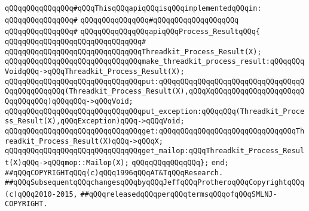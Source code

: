 \verb|qQQqqQQqqQQqqQQq#qQQqThisqQQqapiqQQqisqQQqimplementedqQQqin:|\newline
\verb|qQQqqQQqqQQqqQQq#|\newline
\verb|qQQqqQQqqQQqqQQq#qQQqqQQqqQQqqQQqqQQq|\newline
\verb|qQQqqQQqqQQqqQQq#|\newline
\verb|qQQqqQQqqQQqqQQqapiqQQqProcess_ResultqQQq{|\newline
\verb|qQQqqQQqqQQqqQQqqQQqqQQqqQQqqQQq#|\newline
\verb|qQQqqQQqqQQqqQQqqQQqqQQqqQQqqQQqThreadkit_Process_Result(X);|\newline
\newline
\verb|qQQqqQQqqQQqqQQqqQQqqQQqqQQqqQQqmake_threadkit_process_result:qQQqqQQqVoidqQQq->qQQqThreadkit_Process_Result(X);|\newline
\newline
\verb|qQQqqQQqqQQqqQQqqQQqqQQqqQQqqQQqput:qQQqqQQqqQQqqQQqqQQqqQQqqQQqqQQqqQQqqQQqqQQqqQQq(Threadkit_Process_Result(X),qQQqXqQQqqQQqqQQqqQQqqQQqqQQqqQQqqQQq)qQQqqQQq->qQQqVoid;|\newline
\verb|qQQqqQQqqQQqqQQqqQQqqQQqqQQqqQQqput_exception:qQQqqQQq(Threadkit_Process_Result(X),qQQqException)qQQq->qQQqVoid;|\newline
\newline
\verb|qQQqqQQqqQQqqQQqqQQqqQQqqQQqqQQqget:qQQqqQQqqQQqqQQqqQQqqQQqqQQqqQQqThreadkit_Process_Result(X)qQQq->qQQqX;|\newline
\verb|qQQqqQQqqQQqqQQqqQQqqQQqqQQqqQQqget_mailop:qQQqThreadkit_Process_Result(X)qQQq->qQQqmop::Mailop(X);|\newline
\verb|qQQqqQQqqQQqqQQq};|\newline
\verb|end;|\newline
\newline
\newline
\verb|##qQQqCOPYRIGHTqQQq(c)qQQq1996qQQqAT&TqQQqResearch.|\newline
\verb|##qQQqSubsequentqQQqchangesqQQqbyqQQqJeffqQQqProtheroqQQqCopyrightqQQq(c)qQQq2010-2015,|\newline
\verb|##qQQqreleasedqQQqperqQQqtermsqQQqofqQQqSMLNJ-COPYRIGHT.|\newline

